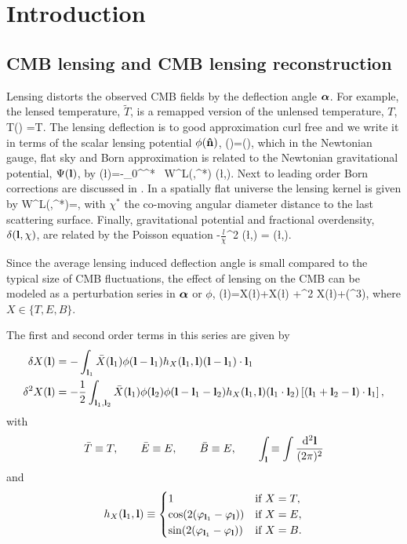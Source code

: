 \documentclass[prd,superscriptaddress,nofootinbib,floatfix,notitlepage]{revtex4-1}
\begin{document}
\section{Introduction}


\subsection{CMB lensing and CMB lensing reconstruction}

Lensing distorts the observed CMB fields by the deflection angle ${\boldsymbol{\alpha}}$. For example, the lensed temperature, $\tilde T$, is a remapped version of the unlensed temperature, $T$,
\beq
\label{eq:1}
\tilde T(\vn) =T\left[\vn+\va(\vn)\right].
\eeq 
The lensing deflection is to good approximation curl free and we write it in terms of the scalar lensing potential $\phi({\bf\hat{n}})$,
\beq
\label{eq:2}
\va(\vn)=\nabla \phi(\vn),
\eeq
which in the Newtonian gauge, flat sky and Born approximation is related to the Newtonian gravitational potential, $\Psi({\bf l})$, by
\beq
\label{eq:phi}
\phi(\l)=-\int_0^{\chi^*} \ud \chi\, W^{L}(\chi,\chi^*) \Psi(\l,\chi).
\eeq
Next to leading order Born corrections are discussed in . In a spatially flat universe the lensing kernel is given by
\beq
W^{L}(\chi,\chi^*)=\frac{\chi^*-\chi}{\chi\chi^*},
\eeq
with $\chi^*$ the co-moving angular diameter distance to the last scattering surface.
Finally, gravitational potential and fractional overdensity, $\delta({\bf l},\chi)$, are related by the Poisson equation
\beq
-\(\frac{l}{\chi}\)^2 \Psi(\l,\chi) =  \delta(\l,\chi).
\eeq


Since the average lensing induced deflection angle is small compared to the typical size of CMB fluctuations, the effect of lensing on the CMB can be modeled as a perturbation series in ${\boldsymbol{\alpha}}$ or $\phi$,
\beq
{}(\l)=X(\l)+\delta X(\l) +\delta^2 X(\l)+(\phi^3),
\eeq
where $X\in \{T,E,B\}$.


The first and second order terms in this series are given by
\begin{align}
  \label{eq:21}
  \delta X({\bf l}) &= -\int_{{\bf l}_1}\bar{X}({\bf l}_1)\phi({\bf l}-{\bf l}_1)h_X({\bf l}_1,{\bf l})({\bf l}-{\bf l}_1)\cdot {\bf l}_1 \\
  \delta^2 X({\bf l}) &= -\frac{1}{2}\int_{{\bf l}_1,{\bf l}_2}\bar{X}({\bf l}_1)\phi({\bf l}_2)\phi({\bf l}-{\bf l}_1-{\bf l}_2)h_X({\bf l}_1,{\bf l})({\bf l}_1\cdot{\bf l}_2)\left[({\bf l}_1+{\bf l}_2-{\bf l})\cdot{\bf l}_1\right],
\end{align}
with
\begin{equation}
  \label{eq:22}
  \bar{T}\equiv T,\qquad\bar{E}\equiv E,\qquad \bar{B} \equiv E,\qquad \int_{\bf l}\equiv\int\frac{{\rm d}^2 {\bf l}}{(2\pi)^2}
\end{equation}
and
\begin{equation}
  \label{eq:hXDef}
  h_X({\bf l}_1,{\bf l}) \equiv 
  \begin{cases}
    1 & \mbox{if } X=T, \\
    \cos(2(\varphi_{{\bf l}_1}-\varphi_{\bf l})) &  \mbox{if } X=E, \\
    \sin(2(\varphi_{{\bf l}_1}-\varphi_{\bf l})) & \mbox{if } X=B.
  \end{cases}
\end{equation}
\end{document}
